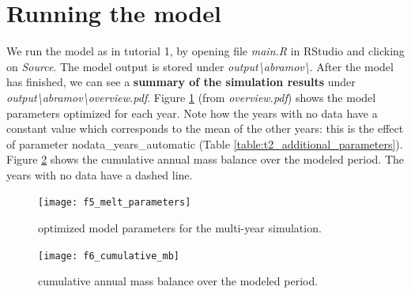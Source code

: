 \documentclass[15pt]{extarticle}
\begin{document}
\section{Running the model}
We run the model as in tutorial 1, by opening file \textit{main.R} in RStudio and clicking on \textit{Source}. The model output is stored under \textit{output\textbackslash abramov\textbackslash}. After the model has finished, we can see a \textbf{summary of the simulation results} under \textit{output\textbackslash abramov\textbackslash overview.pdf}. Figure \ref{fig:f5_melt_parameters} (from \textit{overview.pdf}) shows the model parameters optimized for each year. Note how the years with no data have a constant value which corresponds to the mean of the other years: this is the effect of parameter nodata\_years\_automatic (Table \ref{table:t2_additional_parameters}). Figure \ref{fig:f6_cumulative_mb} shows the cumulative annual mass balance over the modeled period. The years with no data have a dashed line. 



\begin{figure}[ht]
    \centering
    \texttt{[image: f5\_melt\_parameters]}
    \caption{optimized model parameters for the multi-year simulation.}
    \label{fig:f5_melt_parameters}
\end{figure}

\begin{figure}[ht]
    \centering
    \texttt{[image: f6\_cumulative\_mb]}
    \caption{cumulative annual mass balance over the modeled period.}
    \label{fig:f6_cumulative_mb}
\end{figure}


\clearpage
\end{document}
